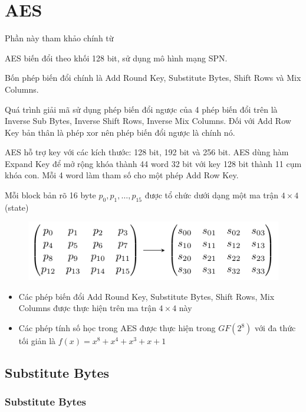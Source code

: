 \chapter{AES}

Phần này tham khảo chính từ \cite{nhatrang}

AES biến đổi theo khối 128 bit, sử dụng mô hình mạng SPN.

Bốn phép biến đổi chính là Add Round Key, Substitute Bytes, Shift Rows và Mix Columns.

Quá trình giải mã sử dụng phép biến đổi ngược của 4 phép biến đổi trên là Inverse Sub Bytes, Inverse Shift Rows, Inverse Mix Columns. Đối với Add Row Key bản thân là phép xor nên phép biến đổi ngược là chính nó.

AES hỗ trợ key với các kích thước: 128 bit, 192 bit và 256 bit. AES dùng hàm Expand Key để mở rộng khóa thành 44 word 32 bit với key 128 bit thành 11 cụm khóa con. Mỗi 4 word làm tham số cho một phép Add Row Key.

Mỗi block bản rõ 16 byte $p_0, p_1, \ldots, p_{15}$ được tổ chức dưới dạng một ma trận $4 \times 4$ (state)

\begin{figure}[ht]
    \centering
    \includegraphics{AES/state.pdf}
\end{figure}    

\begin{itemize}
    \item Các phép biến đổi Add Round Key, Substitute Bytes, Shift Rows, Mix Columns được thực hiện trên ma trận $4 \times 4$ này
    \item Các phép tính số học trong AES được thực hiện trong $GF(2^8)$ với đa thức tối giản là $f(x) = x^8 + x^4 + x^3 + x + 1$
\end{itemize}

\section{Substitute Bytes}

\subsection{Substitute Bytes}

